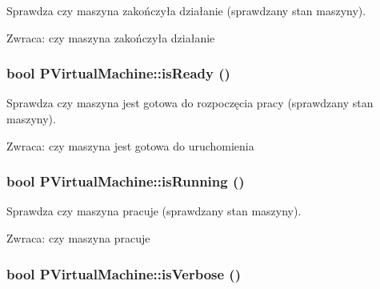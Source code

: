 Sprawdza czy maszyna zakończyła działanie (sprawdzany stan maszyny). \begin{Desc}
\item[Zwraca:]czy maszyna zakończyła działanie \end{Desc}
\hypertarget{classPVirtualMachine_5132bedd5e8480185b48ea6c4783c770}{
\subsubsection[{isReady}]{\setlength{\rightskip}{0pt plus 5cm}bool PVirtualMachine::isReady ()}}
\label{classPVirtualMachine_5132bedd5e8480185b48ea6c4783c770}


Sprawdza czy maszyna jest gotowa do rozpoczęcia pracy (sprawdzany stan maszyny). \begin{Desc}
\item[Zwraca:]czy maszyna jest gotowa do uruchomienia \end{Desc}
\hypertarget{classPVirtualMachine_823195d3ae1615c791dfeb6c8d365a0e}{
\subsubsection[{isRunning}]{\setlength{\rightskip}{0pt plus 5cm}bool PVirtualMachine::isRunning ()}}
\label{classPVirtualMachine_823195d3ae1615c791dfeb6c8d365a0e}


Sprawdza czy maszyna pracuje (sprawdzany stan maszyny). \begin{Desc}
\item[Zwraca:]czy maszyna pracuje \end{Desc}
\hypertarget{classPVirtualMachine_219cd1d08de6d3d5a9117eecc5348d9c}{
\subsubsection[{isVerbose}]{\setlength{\rightskip}{0pt plus 5cm}bool PVirtualMachine::isVerbose ()}}
\label{classPVirtualMachine_219cd1d08de6d3d5a9117eecc5348d9c}


